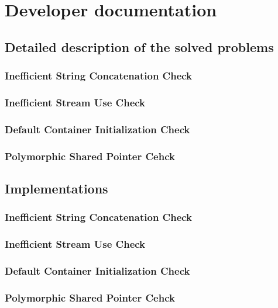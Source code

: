 \section{Developer documentation}
\subsection{Detailed description of the solved problems}
\subsubsection{Inefficient String Concatenation Check}
\subsubsection{Inefficient Stream Use Check}
\subsubsection{Default Container Initialization Check}
\subsubsection{Polymorphic Shared Pointer Cehck}
\subsection{Implementations}
\subsubsection{Inefficient String Concatenation Check}
\subsubsection{Inefficient Stream Use Check}
\subsubsection{Default Container Initialization Check}
\subsubsection{Polymorphic Shared Pointer Cehck}